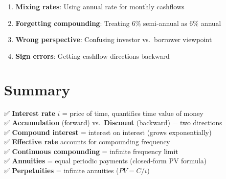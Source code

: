 \documentclass[
  letterpaper,
]{scrbook}
\providecommand{\tightlist}{%
  \setlength{\itemsep}{0pt}\setlength{\parskip}{0pt}}
\begin{document}
\begin{tcolorbox}[enhanced jigsaw, toptitle=1mm, colbacktitle=quarto-callout-warning-color!10!white, opacityback=0, leftrule=.75mm, breakable, colframe=quarto-callout-warning-color-frame, toprule=.15mm, opacitybacktitle=0.6, coltitle=black, bottomrule=.15mm, colback=white, arc=.35mm, titlerule=0mm, rightrule=.15mm, left=2mm, title=\textcolor{quarto-callout-warning-color}{\faExclamationTriangle}\hspace{0.5em}{Common Mistakes}, bottomtitle=1mm]

\begin{enumerate}
\def\labelenumi{\arabic{enumi}.}
\tightlist
\item
  \textbf{Mixing rates}: Using annual rate for monthly cashflows
\item
  \textbf{Forgetting compounding}: Treating 6\% semi-annual as 6\%
  annual
\item
  \textbf{Wrong perspective}: Confusing investor vs.~borrower viewpoint
\item
  \textbf{Sign errors}: Getting cashflow directions backward
\end{enumerate}

\end{tcolorbox}

\section{Summary}\label{summary-3}

✅ \textbf{Interest rate} \(i\) = price of time, quantifies time value
of money\\
✅ \textbf{Accumulation} (forward) vs.~\textbf{Discount} (backward) =
two directions\\
✅ \textbf{Compound interest} = interest on interest (grows
exponentially)\\
✅ \textbf{Effective rate} accounts for compounding frequency\\
✅ \textbf{Continuous compounding} = infinite frequency limit\\
✅ \textbf{Annuities} = equal periodic payments (closed-form PV
formula)\\
✅ \textbf{Perpetuities} = infinite annuities (\(PV = C/i\))
\end{document}
